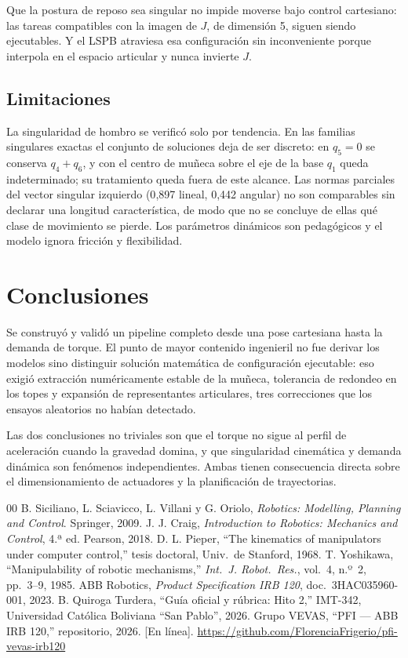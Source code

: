 \documentclass[conference]{IEEEtran}
\begin{document}
Que la postura de reposo sea singular no impide moverse bajo control
cartesiano: las tareas compatibles con la imagen de $J$, de dimensión 5,
siguen siendo ejecutables. Y el LSPB atraviesa esa configuración sin
inconveniente porque interpola en el espacio articular y nunca invierte
$J$.

\subsection{Limitaciones}

La singularidad de hombro se verificó solo por tendencia. En las
familias singulares exactas el conjunto de soluciones deja de ser
discreto: en $q_5=0$ se conserva $q_4+q_6$, y con el centro de muñeca
sobre el eje de la base $q_1$ queda indeterminado; su tratamiento queda
fuera de este alcance. Las normas parciales del vector singular
izquierdo (0{,}897 lineal, 0{,}442 angular) no son comparables sin
declarar una longitud característica, de modo que no se concluye de
ellas qué clase de movimiento se pierde. Los parámetros dinámicos son
pedagógicos y el modelo ignora fricción y flexibilidad.

\section{Conclusiones}

Se construyó y validó un pipeline completo desde una pose cartesiana
hasta la demanda de torque. El punto de mayor contenido ingenieril no
fue derivar los modelos sino distinguir solución matemática de
configuración ejecutable: eso exigió extracción numéricamente estable de
la muñeca, tolerancia de redondeo en los topes y expansión de
representantes articulares, tres correcciones que los ensayos
aleatorios no habían detectado.

Las dos conclusiones no triviales son que el torque no sigue al perfil
de aceleración cuando la gravedad domina, y que singularidad cinemática
y demanda dinámica son fenómenos independientes. Ambas tienen
consecuencia directa sobre el dimensionamiento de actuadores y la
planificación de trayectorias.

\begin{thebibliography}{00}
 B. Siciliano, L. Sciavicco, L. Villani y G. Oriolo,
\textit{Robotics: Modelling, Planning and Control}. Springer, 2009.
 J. J. Craig, \textit{Introduction to Robotics: Mechanics
and Control}, 4.ª ed. Pearson, 2018.
 D. L. Pieper, ``The kinematics of manipulators under
computer control,'' tesis doctoral, Univ.\ de Stanford, 1968.
 T. Yoshikawa, ``Manipulability of robotic mechanisms,''
\textit{Int.\ J. Robot.\ Res.}, vol.~4, n.º~2, pp.~3--9, 1985.
 ABB Robotics, \textit{Product Specification IRB 120},
doc.\ 3HAC035960-001, 2023.
 B. Quiroga Turdera, ``Guía oficial y rúbrica: Hito 2,''
IMT-342, Universidad Católica Boliviana ``San Pablo'', 2026.
 Grupo VEVAS, ``PFI --- ABB IRB 120,'' repositorio, 2026.
[En línea]. \url{https://github.com/FlorenciaFrigerio/pfi-vevas-irb120}
\end{thebibliography}
\end{document}
